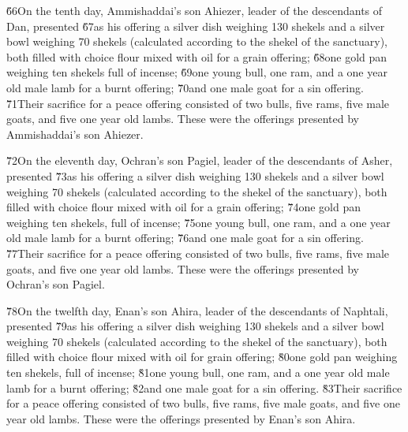 \v{66}On the tenth day, Ammishaddai's son Ahiezer, leader of the descendants of Dan, presented \v{67}as his offering a silver dish weighing 130 shekels and a silver bowl weighing 70 shekels (calculated according to the shekel of the sanctuary), both filled with choice flour mixed with oil for a grain offering; \v{68}one gold pan weighing ten shekels full of incense; \v{69}one young bull, one ram, and a one year old male lamb for a burnt offering; \v{70}and one male goat for a sin offering. \v{71}Their sacrifice for a peace offering consisted of two bulls, five rams, five male goats, and five one year old lambs. These were the offerings presented by Ammishaddai's son Ahiezer.

\v{72}On the eleventh day, Ochran's son Pagiel, leader of the descendants of Asher, presented \v{73}as his offering a silver dish weighing 130 shekels and a silver bowl weighing 70 shekels (calculated according to the shekel of the sanctuary), both filled with choice flour mixed with oil for a grain offering; \v{74}one gold pan weighing ten shekels, full of incense; \v{75}one young bull, one ram, and a one year old male lamb for a burnt offering; \v{76}and one male goat for a sin offering. \v{77}Their sacrifice for a peace offering consisted of two bulls, five rams, five male goats, and five one year old lambs. These were the offerings presented by Ochran's son Pagiel.

\v{78}On the twelfth day, Enan's son Ahira, leader of the descendants of Naphtali, presented \v{79}as his offering a silver dish weighing 130 shekels and a silver bowl weighing 70 shekels (calculated according to the shekel of the sanctuary), both filled with choice flour mixed with oil for grain offering; \v{80}one gold pan weighing ten shekels, full of incense; \v{81}one young bull, one ram, and a one year old male lamb for a burnt offering; \v{82}and one male goat for a sin offering. \v{83}Their sacrifice for a peace offering consisted of two bulls, five rams, five male goats, and five one year old lambs. These were the offerings presented by Enan's son Ahira.

